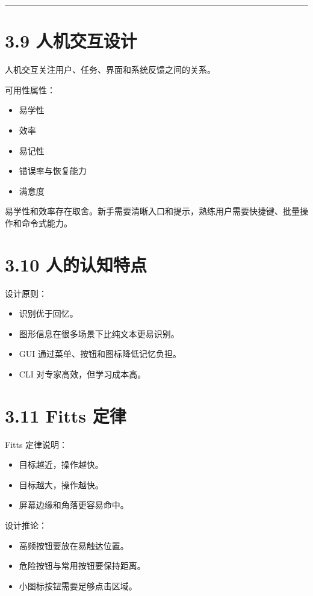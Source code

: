 \documentclass[UTF8,zihao=-4]{ctexart}
\begin{document}
\bigskip\hrule\bigskip

\section{3.9 人机交互设计}

人机交互关注用户、任务、界面和系统反馈之间的关系。

可用性属性：

\begin{itemize}
\item 易学性
\item 效率
\item 易记性
\item 错误率与恢复能力
\item 满意度
\end{itemize}

易学性和效率存在取舍。新手需要清晰入口和提示，熟练用户需要快捷键、批量操作和命令式能力。

\section{3.10 人的认知特点}

设计原则：

\begin{itemize}
\item 识别优于回忆。
\item 图形信息在很多场景下比纯文本更易识别。
\item GUI 通过菜单、按钮和图标降低记忆负担。
\item CLI 对专家高效，但学习成本高。
\end{itemize}

\section{3.11 Fitts 定律}

Fitts 定律说明：

\begin{itemize}
\item 目标越近，操作越快。
\item 目标越大，操作越快。
\item 屏幕边缘和角落更容易命中。
\end{itemize}

设计推论：

\begin{itemize}
\item 高频按钮要放在易触达位置。
\item 危险按钮与常用按钮要保持距离。
\item 小图标按钮需要足够点击区域。
\end{itemize}
\end{document}
